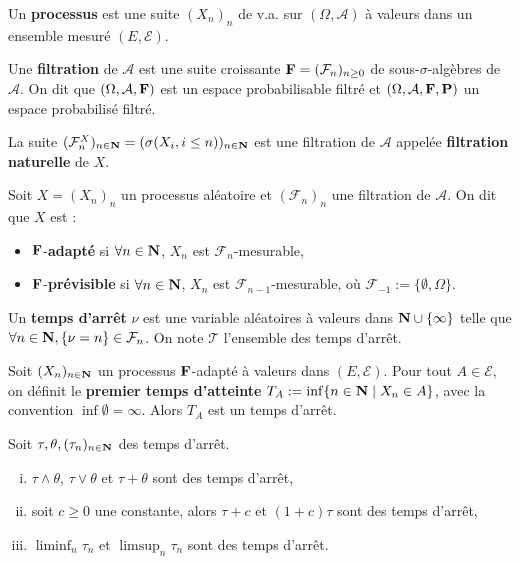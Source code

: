 \begin{defn}
	Un \textbf{processus} est une suite $(X_n)_n$ de v.a. sur $(\Omega,\mathcal{A})$ à valeurs dans un ensemble mesuré $(E,\mathcal{E})$.
\end{defn}

\begin{defn}
	Une \textbf{filtration} de $\mathcal{A}$ est une suite croissante $\mathbf{F} = (\mathcal{F}_n)_{n \geq 0}$ de sous-$\sigma$-algèbres de $\mathcal{A}$.
	On dit que $(\Omega,\mathcal{A},\mathbf{F})$ est un espace probabilisable filtré et $(\Omega,\mathcal{A},\mathbf{F},\mathbf{P})$ un espace probabilisé filtré.
\end{defn}

\begin{ex}
	La suite $(\mathcal{F}_n^X)_{n \in \mathbf{N}} = (\sigma(X_i, i \leq n))_{n \in \mathbf{N}}$ est une filtration de $\mathcal{A}$ appelée \textbf{filtration naturelle} de $X$.
\end{ex}

\begin{defn}
	Soit $X = (X_n)_n$ un processus aléatoire et $(\mathcal{F}_n)_n$ une filtration de $\mathcal{A}$.
	On dit que $X$ est :
	\begin{itemize}
		\item[\textbullet] $\mathbf{F}$-\textbf{adapté} si $\forall n \in \mathbf{N}$, $X_n$ est $\mathcal{F}_n$-mesurable,
		\item[\textbullet] $\mathbf{F}$-\textbf{prévisible} si $\forall n \in \mathbf{N}$, $X_n$ est $\mathcal{F}_{n - 1}$-mesurable, où $\mathcal{F}_{-1} := \{ \emptyset, \Omega \}$.
	\end{itemize}
\end{defn}

\begin{defn}
	Un \textbf{temps d'arrêt} $\nu$ est une variable aléatoires à valeurs dans $\mathbf{N} \cup \{ \infty \}$ telle que $\forall n \in \mathbf{N}, \{ \nu = n \} \in \mathcal{F}_n$.
	On note $\mathcal{T}$ l'ensemble des temps d'arrêt.
\end{defn}

\begin{pop}
	Soit $(X_n)_{n \in \mathbf{N}}$ un processus $\mathbf{F}$-adapté à valeurs dans $(E,\mathcal{E})$.
	Pour tout $A \in \mathcal{E}$, on définit le \textbf{premier temps d'atteinte} $T_A := \inf \{ n \in \mathbf{N} \mid X_n \in A \}$, avec la convention $\inf \emptyset = \infty$.
	Alors $T_A$ est un temps d'arrêt.
\end{pop}

\begin{pop}
	Soit $\tau, \theta, (\tau_n)_{n \in \mathbf{N}}$ des temps d'arrêt.
	\begin{enumerate}[(i)]
		\item $\tau \wedge \theta$, $\tau \vee \theta$ et $\tau + \theta$ sont des temps d'arrêt,
		\item soit $c \geq 0$ une constante, alors $\tau + c$ et $(1 + c) \tau$ sont des temps d'arrêt,
		\item $\liminf_n \tau_n$ et $\limsup_n \tau_n$ sont des temps d'arrêt.
	\end{enumerate}
\end{pop}

